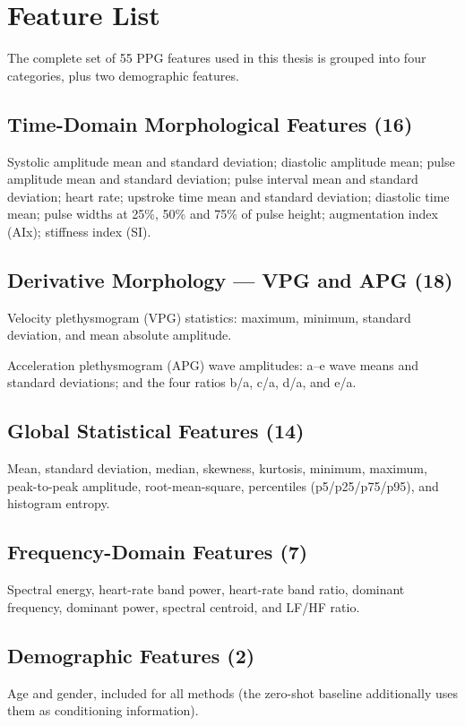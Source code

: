 \chapter{Feature List}
\label{app:features}

The complete set of 55 PPG features used in this thesis is grouped into four categories, plus two demographic features.

\section{Time-Domain Morphological Features (16)}

Systolic amplitude mean and standard deviation; diastolic amplitude mean; pulse amplitude mean and standard deviation; pulse interval mean and standard deviation; heart rate; upstroke time mean and standard deviation; diastolic time mean; pulse widths at 25\%, 50\% and 75\% of pulse height; augmentation index (AIx); stiffness index (SI).

\section{Derivative Morphology --- VPG and APG (18)}

Velocity plethysmogram (VPG) statistics: maximum, minimum, standard deviation, and mean absolute amplitude.

Acceleration plethysmogram (APG) wave amplitudes: a--e wave means and standard deviations; and the four ratios b/a, c/a, d/a, and e/a.

\section{Global Statistical Features (14)}

Mean, standard deviation, median, skewness, kurtosis, minimum, maximum, peak-to-peak amplitude, root-mean-square, percentiles (p5/p25/p75/p95), and histogram entropy.

\section{Frequency-Domain Features (7)}

Spectral energy, heart-rate band power, heart-rate band ratio, dominant frequency, dominant power, spectral centroid, and LF/HF ratio.

\section{Demographic Features (2)}

Age and gender, included for all methods (the zero-shot baseline additionally uses them as conditioning information).
